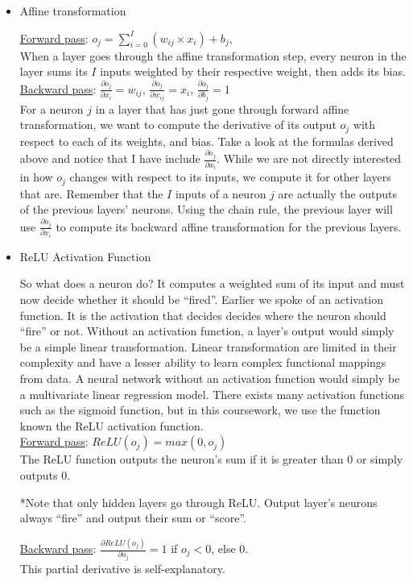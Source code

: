 \begin{itemize}
   \item Affine transformation
  
     \underline{Forward pass}: $o_j= \sum\limits_{i=0}^{I} (w_{ij} \times x_{i}) + b_j$, \\
     When a layer goes through the affine transformation step,
     every neuron in the layer sums its $I$ inputs weighted by their respective weight, then adds its bias.\\

     \underline{Backward pass}: $\frac{\partial o_j}{\partial x_i} = w_{ij}$,
     \space\space $\frac{\partial o_j}{\partial w_{ij}} = x_i$,
     \space\space$\frac{\partial o_j}{\partial b_j} = 1$\\ 
     For a neuron $j$ in a layer that has just gone through forward affine transformation,
     we want to compute the derivative of its output $o_j$ with respect to each of its weights, and bias.
     Take a look at the formulas derived above and notice that I have include $\frac{\partial o_j}{\partial x_i}$.
     While we are not directly interested in how $o_j$ changes with respect to its inputs, we compute it for other layers that are.
     Remember that the $I$ inputs of a neuron $j$ are actually the outputs of the previous layers' neurons.
     Using the chain rule, the previous layer will use $\frac{\partial o_j}{\partial x_i}$
     to compute its backward affine transformation for the previous layers.

   \item ReLU Activation Function
   
     So what does a neuron do? It computes a weighted sum of its input and must now decide whether it should be ``fired''.
     Earlier we spoke of an activation function.
     It is the activation that decides decides where the neuron should ``fire'' or not.
     Without an activation function, a layer's output would simply be a simple linear transformation.
     Linear transformation are limited in their complexity and have a lesser ability to learn complex functional mappings from data.
     A neural network without an activation function would simply be a multivariate linear regression model.
     There exists many activation functions such as the sigmoid function,
     but in this coursework, we use the function known the ReLU activation function.\\
     
     \underline{Forward pass}: $ReLU(o_j) = max(0,o_j)$\\
     The ReLU function outputs the neuron's sum if it is greater than 0 or simply outputs 0.
     
     *Note that only hidden layers go through ReLU.
     Output layer's neurons always ``fire'' and output their sum or ``score''.

     \underline{Backward pass}: $\frac{\partial ReLU(o_j)}{\partial o_j} = 1$ if $o_j < 0$, else 0.\\
     This partial derivative is self-explanatory.
     
\end{itemize}
